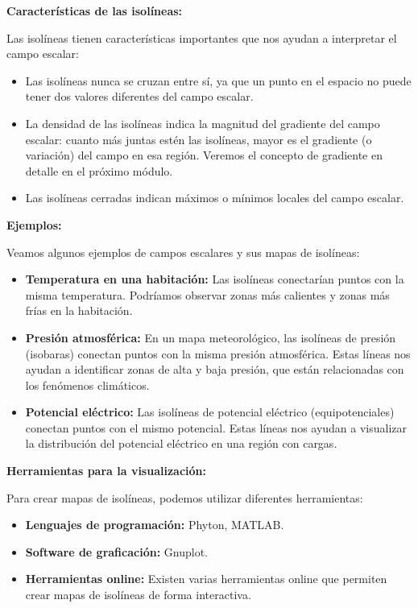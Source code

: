 \documentclass{article}
\begin{document}
\textbf{Características de las isolíneas:}

Las isolíneas tienen características importantes que nos ayudan a interpretar el campo escalar:

\begin{itemize}
\item[\textbullet] Las isolíneas nunca se cruzan entre sí, ya que un punto en el espacio no puede tener dos valores diferentes del campo escalar.
\item[\textbullet] La densidad de las isolíneas indica la magnitud del gradiente del campo escalar: cuanto más juntas estén las isolíneas, mayor es el gradiente (o variación) del campo en esa región. Veremos el concepto de gradiente en detalle en el próximo módulo.
\item[\textbullet] Las isolíneas cerradas indican máximos o mínimos locales del campo escalar.
\end{itemize}

\textbf{Ejemplos:}

Veamos algunos ejemplos de campos escalares y sus mapas de isolíneas:

\begin{itemize}
\item[\textbullet] \textbf{Temperatura en una habitación:} Las isolíneas conectarían puntos con la misma temperatura. Podríamos observar zonas más calientes y zonas más frías en la habitación.
\item[\textbullet] \textbf{Presión atmosférica:} En un mapa meteorológico, las isolíneas de presión (isobaras) conectan puntos con la misma presión atmosférica. Estas líneas nos ayudan a identificar zonas de alta y baja presión, que están relacionadas con los fenómenos climáticos.
\item[\textbullet] \textbf{Potencial eléctrico:} Las isolíneas de potencial eléctrico (equipotenciales) conectan puntos con el mismo potencial. Estas líneas nos ayudan a visualizar la distribución del potencial eléctrico en una región con cargas.
\end{itemize}

\textbf{Herramientas para la visualización:}

Para crear mapas de isolíneas, podemos utilizar diferentes herramientas:

\begin{itemize}
\item[\textbullet] \textbf{Lenguajes de programación:} Phyton, MATLAB.
\item[\textbullet] \textbf{Software de graficación:} Gnuplot.
\item[\textbullet] \textbf{Herramientas online:} Existen varias herramientas online que permiten crear mapas de isolíneas de forma interactiva.
\end{itemize}
\end{document}
